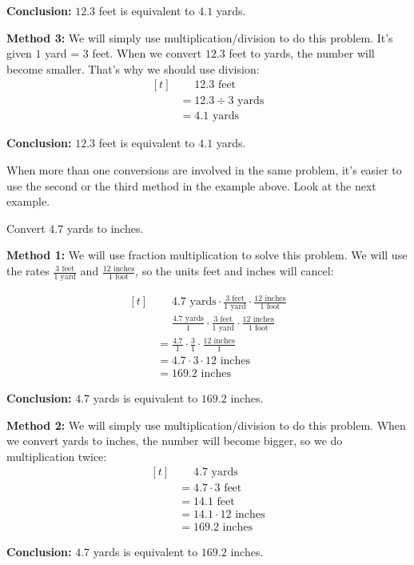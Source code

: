 \begin{solution}
\textbf{Conclusion:} $12.3$ feet is equivalent to $4.1$ yards.

\textbf{Method 3:} We will simply use multiplication/division to do this problem. It's given $1$ yard = $3$ feet. When we convert $12.3$ feet to yards, the number will become smaller. That's why we should use division:
\[
\begin{aligned}[t]
	&\phantom{{}=} 12.3 \text{ feet} \\
	&= 12.3 \div 3 \text{ yards} \\
	&= 4.1 \text{ yards}
\end{aligned}
\]

\textbf{Conclusion:} $12.3$ feet is equivalent to $4.1$ yards.

\end{solution}

When more than one conversions are involved in the same problem, it's easier to use the second or the third method in the example above. Look at the next example.

\begin{myexample}
Convert $4.7$ yards to inches.
\end{myexample}
\begin{solution}

\textbf{Method 1:} We will use fraction multiplication to solve this problem. We will use the rates $\frac{3 \text{ feet}}{1 \text{ yard}}$ and $\frac{12 \text{ inches}}{1 \text{ foot}}$, so the units feet and inches will cancel:

\[
\begin{aligned}[t]
	&\phantom{{}=}4.7 \text{ yards} \cdot \frac{3 \text{ feet}}{1 \text{ yard}} \cdot \frac{12 \text{ inches}}{1 \text{ foot}}  \\
	&\phantom{{}=} \frac{4.7 \text{ yards}}{1} \cdot \frac{3 \text{ feet}}{1 \text{ yard}} \cdot \frac{12 \text{ inches}}{1 \text{ foot}}  \\
	&= \frac{4.7}{1} \cdot \frac{3}{1} \cdot \frac{12 \text{ inches}}{1} \\
	&= 4.7 \cdot 3 \cdot 12 \text{ inches} \\
	&= 169.2 \text{ inches}
\end{aligned}
\]

\textbf{Conclusion:} $4.7$ yards is equivalent to $169.2$ inches.

\textbf{Method 2:} We will simply use multiplication/division to do this problem. When we convert yards to inches, the number will become bigger, so we do multiplication twice:
\[
\begin{aligned}[t]
	&\phantom{{}=} 4.7 \text{ yards} \\
	&= 4.7 \cdot 3 \text{ feet} \\
	&= 14.1 \text{ feet} \\
	&= 14.1 \cdot 12 \text{ inches} \\
	&= 169.2 \text{ inches}
\end{aligned}
\]

\textbf{Conclusion:} $4.7$ yards is equivalent to $169.2$ inches.

\end{solution}

